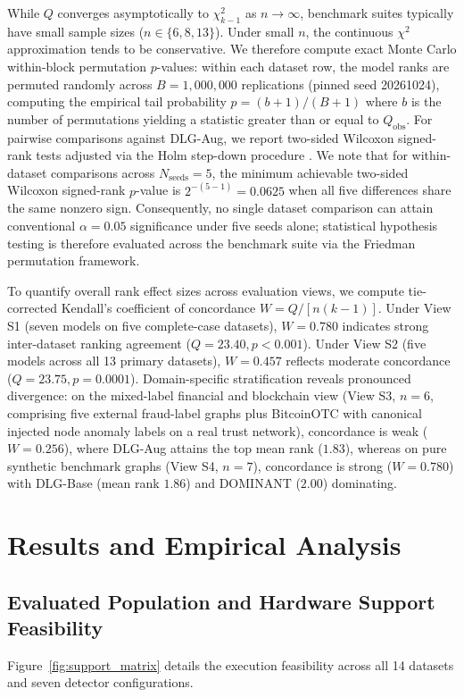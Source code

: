 \documentclass[applsci,article,submit,moreauthors,pdftex]{Definitions/mdpi}
\begin{document}
While $Q$ converges asymptotically to $\chi^2_{k-1}$ as $n \to \infty$, benchmark suites typically have small sample sizes ($n \in \{6, 8, 13\}$). Under small $n$, the continuous $\chi^2$ approximation tends to be conservative. We therefore compute exact Monte Carlo within-block permutation $p$-values: within each dataset row, the model ranks are permuted randomly across $B=1,000,000$ replications (pinned seed 20261024), computing the empirical tail probability $p = (b + 1) / (B + 1)$ where $b$ is the number of permutations yielding a statistic greater than or equal to $Q_{\mathrm{obs}}$. For pairwise comparisons against DLG-Aug, we report two-sided Wilcoxon signed-rank tests adjusted via the Holm step-down procedure \cite{holm1979}. We note that for within-dataset comparisons across $N_{\mathrm{seeds}} = 5$, the minimum achievable two-sided Wilcoxon signed-rank $p$-value is $2^{-(5-1)} = 0.0625$ when all five differences share the same nonzero sign. Consequently, no single dataset comparison can attain conventional $\alpha = 0.05$ significance under five seeds alone; statistical hypothesis testing is therefore evaluated across the benchmark suite via the Friedman permutation framework.

To quantify overall rank effect sizes across evaluation views, we compute tie-corrected Kendall's coefficient of concordance $W = Q / [n (k - 1)]$. Under View S1 (seven models on five complete-case datasets), $W=0.780$ indicates strong inter-dataset ranking agreement ($Q=23.40, p < 0.001$). Under View S2 (five models across all 13 primary datasets), $W=0.457$ reflects moderate concordance ($Q=23.75, p = 0.0001$). Domain-specific stratification reveals pronounced divergence: on the mixed-label financial and blockchain view (View S3, $n=6$, comprising five external fraud-label graphs plus BitcoinOTC with canonical injected node anomaly labels on a real trust network), concordance is weak ($W=0.256$), where DLG-Aug attains the top mean rank ($1.83$), whereas on pure synthetic benchmark graphs (View S4, $n=7$), concordance is strong ($W=0.780$) with DLG-Base (mean rank $1.86$) and DOMINANT ($2.00$) dominating.

\section{Results and Empirical Analysis}
\label{sec:results}

\subsection{Evaluated Population and Hardware Support Feasibility}
Figure~\ref{fig:support_matrix} details the execution feasibility across all 14 datasets and seven detector configurations.
\end{document}
